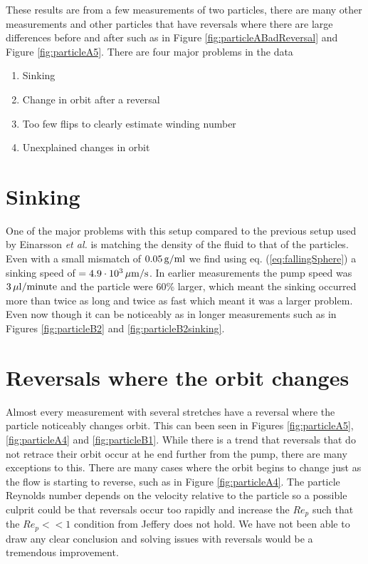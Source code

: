 These results are from a few measurements of two particles, there are many other measurements and other particles that have reversals where there are large differences before and after such as in Figure \ref{fig:particleABadReversal} and Figure \ref{fig:particleA5}. There are four major problems in the data 

\begin{enumerate}
\item Sinking
\item Change in orbit after a reversal
\item Too few flips to clearly estimate winding number
\item Unexplained changes in orbit 
\end{enumerate}

\section{Sinking}
One of the major problems with this setup compared to the previous setup used by Einarsson \emph{et al.} \cite{JonasExperiment} is matching the density of the fluid to that of the particles. Even with a small mismatch of $\unit[0.05]{g/ml}$ we find using eq. (\ref{eq:fallingSphere}) a sinking speed of $= \unit[4.9\cdot10^3 ]{\mu m/s}$. In earlier measurements the pump speed was $\unit[3]{\mu l/minute}$ and the particle were 60\% larger, which meant the sinking occurred more than twice as long and twice as fast which meant it was a larger problem. Even now though it can be noticeably as in longer measurements such as in Figures \ref{fig:particleB2} and \ref{fig:particleB2sinking}.

\section{Reversals where the orbit changes}
Almost every measurement with several stretches have a reversal where the particle noticeably changes orbit. This can been seen in Figures \ref{fig:particleA5}, \ref{fig:particleA4} and \ref{fig:particleB1}. While there is a trend that reversals that do not retrace their orbit occur at he end further from the pump, there are many exceptions to this. There are many cases where the orbit begins to change just as the flow is starting to reverse, such as in Figure \ref{fig:particleA4}. The particle Reynolds number depends on the velocity relative to the particle so a possible culprit could be that reversals occur too rapidly and increase the $Re_p$ such that the $Re_p << 1$ condition from Jeffery \cite{Jeffery} does not hold. We have not been able to draw any clear conclusion and solving issues with reversals would be a tremendous improvement.


